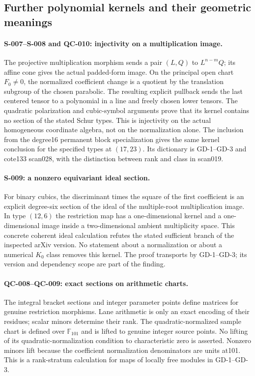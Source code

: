 \subsection{Further polynomial kernels and their geometric meanings}

\paragraph{S-007--S-008 and QC-010: injectivity on a multiplication image.}
The projective multiplication morphism sends a pair $(L,Q)$ to
$L^{n-m}Q$; its affine cone gives the actual padded-form image.
On the principal open chart $F_0\ne0$, the normalized coefficient
change is a quotient by the translation subgroup of the chosen
parabolic. The resulting explicit pullback sends the last centered
tensor to a polynomial in a line and freely chosen lower tensors.
The quadratic polarization and cubic-symbol arguments prove that
its kernel contains no section of the stated Schur types. This is
injectivity on the actual homogeneous coordinate algebra, not on
the normalization alone. The inclusion from the degree16 permanent
block specialization gives the same kernel conclusion for the
specified types at $(17,23)$. Its dictionary is GD-1--GD-3 and
cote133 scan028, with the distinction between rank and class in scan019.

\paragraph{S-009: a nonzero equivariant ideal section.}
For binary cubics, the discriminant times the square of the first
coefficient is an explicit degree-six section of the ideal of the
multiple-root multiplication image. In type $(12,6)$ the restriction
map has a one-dimensional kernel and a one-dimensional image inside
a two-dimensional ambient multiplicity space. This concrete coherent
ideal calculation refutes the stated sufficient branch of the inspected
arXiv version. No statement about a normalization or about a numerical
$K_0$ class removes this kernel. The proof transports by GD-1--GD-3;
its version and dependency scope are part of the finding.

\paragraph{QC-008--QC-009: exact sections on arithmetic charts.}
The integral bracket sections and integer parameter points define
matrices for genuine restriction morphisms. Lane arithmetic is only
an exact encoding of their residues; scalar minors determine their
rank. The quadratic-normalized sample chart is defined over
$\mathbb F_{101}$ and is lifted to genuine integer source points.
No lifting of its quadratic-normalization condition to characteristic
zero is asserted. Nonzero minors lift because the coefficient
normalization denominators are units at101. This is a rank-stratum
calculation for maps of locally free modules in GD-1--GD-3.

